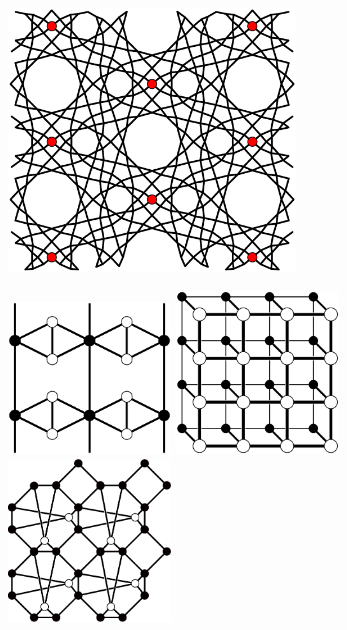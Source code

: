 \documentclass{beamer}
\begin{document}
\begin{frame}
  \begin{center}
    \includegraphics[width=3in]{al-equilibrium}
  \end{center}
\end{frame}

\begin{frame}
  \begin{center}
    \includegraphics[width=1.7in]{unstable}
    \qquad
    \includegraphics[width=1.7in]{ladder}\\
    \includegraphics[width=1.7in]{collision}
  \end{center}
\end{frame}
\end{document}
